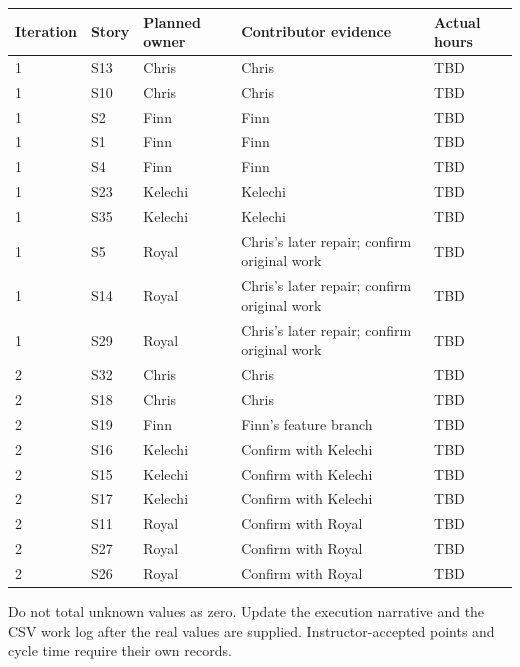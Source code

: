 \documentclass[11pt,a4paper]{article}
\begin{document}
\begin{tabularx}{\textwidth}{@{}l l l X l@{}}
\toprule Iteration & Story & Planned owner & Contributor evidence & Actual hours\\\midrule
1 & S13 & Chris & Chris & TBD\\
1 & S10 & Chris & Chris & TBD\\
1 & S2 & Finn & Finn & TBD\\
1 & S1 & Finn & Finn & TBD\\
1 & S4 & Finn & Finn & TBD\\
1 & S23 & Kelechi & Kelechi & TBD\\
1 & S35 & Kelechi & Kelechi & TBD\\
1 & S5 & Royal & Chris's later repair; confirm original work & TBD\\
1 & S14 & Royal & Chris's later repair; confirm original work & TBD\\
1 & S29 & Royal & Chris's later repair; confirm original work & TBD\\\midrule
2 & S32 & Chris & Chris & TBD\\
2 & S18 & Chris & Chris & TBD\\
2 & S19 & Finn & Finn's feature branch & TBD\\
2 & S16 & Kelechi & Confirm with Kelechi & TBD\\
2 & S15 & Kelechi & Confirm with Kelechi & TBD\\
2 & S17 & Kelechi & Confirm with Kelechi & TBD\\
2 & S11 & Royal & Confirm with Royal & TBD\\
2 & S27 & Royal & Confirm with Royal & TBD\\
2 & S26 & Royal & Confirm with Royal & TBD\\\bottomrule
\end{tabularx}

Do not total unknown values as zero. Update the execution narrative and the CSV work log after the real values are supplied. Instructor-accepted points and cycle time require their own records.
\end{document}

